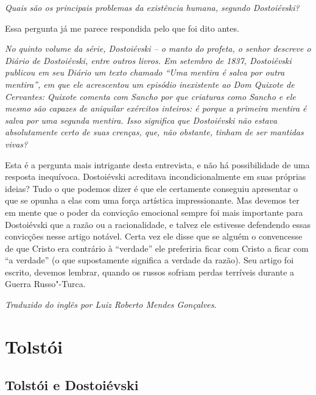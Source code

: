 {{\medskip

\emph{Quais são os principais problemas da existência humana, segundo
Dostoiévski?}

Essa pergunta já me parece respondida pelo que foi dito antes.

\medskip

\emph{No quinto volume da série, \emph{Dostoiévski -- o manto do profeta}, o
senhor descreve o \emph{Diário} de Dostoiévski, entre outros livros.
Em setembro de 1837, Dostoiévski publicou em seu \emph{Diário} um texto
chamado ``Uma mentira é salva por outra mentira'', em que ele acrescentou
um episódio inexistente ao \emph{Dom Quixote} de Cervantes: Quixote comenta
com Sancho por que criaturas como Sancho e ele mesmo são capazes de aniquilar exércitos
inteiros: é porque a primeira mentira é salva por uma segunda mentira.
Isso significa que Dostoiévski não estava absolutamente certo de suas
crenças, que, não obstante, tinham de ser mantidas vivas?}

Esta é a pergunta mais intrigante desta entrevista, e não há
possibilidade de uma resposta inequívoca. Dostoiévski acreditava
incondicionalmente em suas próprias ideias? Tudo o que podemos dizer é
que ele certamente conseguiu apresentar o que se opunha a elas com uma
força artística impressionante. Mas devemos ter em mente que o poder da
convicção emocional sempre foi mais importante para Dostoiévski que a
razão ou a racionalidade, e talvez ele estivesse defendendo essas
convicções nesse artigo notável. Certa vez ele disse que se alguém o
convencesse de que Cristo era contrário à ``verdade'' ele preferiria ficar
com Cristo a ficar com ``a verdade'' (o que supostamente significa a
verdade da razão). Seu artigo foi escrito, devemos lembrar, quando os
russos sofriam perdas terríveis durante a Guerra Russo"-Turca.

\bigskip

\noindent
\emph{Traduzido do inglês por Luiz Roberto Mendes Gonçalves}.



\part{Tolstói}

\chapter{Tolstói e Dostoiévski}


}}
